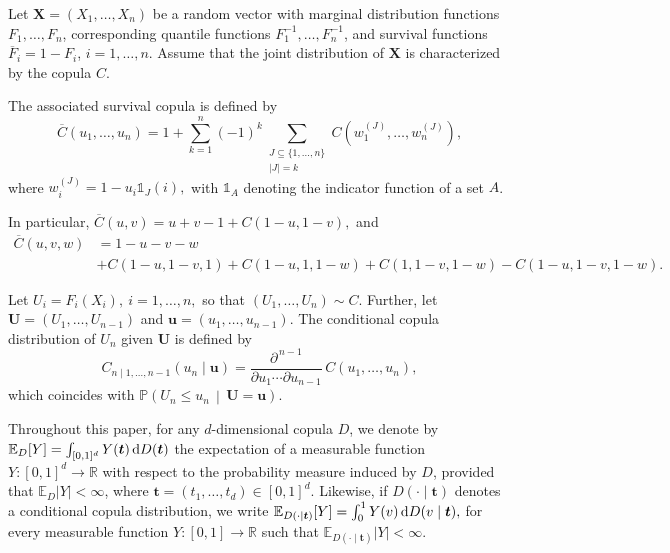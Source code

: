 \documentclass[12pt]{article}
\begin{document}
Let $\boldsymbol{X}=(X_1,\ldots,X_n)$ be a random vector with marginal distribution functions
$F_1,\ldots,F_n$, corresponding quantile functions
$F_1^{-1},\ldots,F_n^{-1}$, and survival functions
$\overline F_i=1-F_i$, $i=1,\ldots,n$.
Assume that the joint distribution of $\boldsymbol{X}$ is characterized by the copula $C$.

The associated survival copula is defined by
\[
\overline{C}(u_1,\ldots,u_n)
=
1
+
\sum_{k=1}^{n}
(-1)^k
\sum_{\substack{J\subseteq\{1,\ldots,n\}\\|J|=k}}
C(w_1^{(J)},\ldots,w_n^{(J)}),
\]
where 
$
w_i^{(J)}
=
1-u_i \mathds{1}_{J}(i),
$
with $\mathds{1}_{A}$ denoting the indicator function of a set 
$A$.

In particular,
$
\overline C(u,v)
=
u+v-1+C(1-u,1-v),
$
and
\begin{align*}
	\overline C(u,v,w)
	&=
	1-u-v-w
	\\[0,2cm]
	&+C(1-u,1-v,1)
	+C(1-u,1,1-w)
	+C(1,1-v,1-w)
	-C(1-u,1-v,1-w).
\end{align*}



Let
$
U_i=F_i(X_i),\ i=1,\ldots,n,
$
so that
$
(U_1,\ldots,U_n)\sim C.
$
Further, let
$
\boldsymbol U=(U_1,\ldots,U_{n-1})
$
and
$\boldsymbol u=(u_1,\ldots,u_{n-1})$. 
The conditional copula distribution of $U_n$ given $\boldsymbol U$ is defined by
\[
C_{n\mid1,\ldots,n-1}
(u_n\mid \boldsymbol u)
=
\frac{\partial^{\,n-1}}
{\partial u_1\cdots\partial u_{n-1}} \, 
C(u_1,\ldots,u_n),
\]
which coincides with
$
\mathbb P
\!\left(
U_n\leqslant u_n
\,\middle|\,
\boldsymbol U=\boldsymbol u
\right).
$

Throughout this paper, for any $d$-dimensional copula $D$, we denote by
$
\mathbb E_D[Y]
=
\int_{[0,1]^d}
Y(\boldsymbol t)\,{\rm d}D(\boldsymbol t)
$
the expectation of a measurable function
$Y:[0,1]^d\to\mathbb R$
with respect to the probability measure induced by $D$, provided that
$\mathbb E_D|Y|<\infty$, where
$\boldsymbol t=(t_1,\ldots,t_d)\in[0,1]^d$.
Likewise, if $D(\cdot\mid\boldsymbol t)$ denotes a conditional copula distribution, we write
$
\mathbb E_{D(\cdot\mid\boldsymbol t)}[Y]
=
\int_0^1
Y(v)\,{\rm d}D(v\mid\boldsymbol t),
$
for every measurable function
$Y:[0,1]\to\mathbb R$
such that
$\mathbb E_{D(\cdot\mid\boldsymbol t)}|Y|<\infty$.
\end{document}
